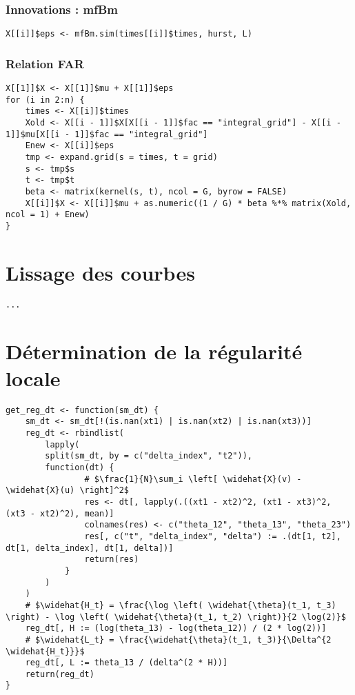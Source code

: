 \subsubsection{Innovations : mfBm}

\begin{verbatim}
X[[i]]$eps <- mfBm.sim(times[[i]]$times, hurst, L)
\end{verbatim}

\subsubsection{Relation FAR}

\begin{verbatim}
X[[1]]$X <- X[[1]]$mu + X[[1]]$eps
for (i in 2:n) {
    times <- X[[i]]$times
    Xold <- X[[i - 1]]$X[X[[i - 1]]$fac == "integral_grid"] - X[[i - 1]]$mu[X[[i - 1]]$fac == "integral_grid"]
    Enew <- X[[i]]$eps
    tmp <- expand.grid(s = times, t = grid)
    s <- tmp$s
    t <- tmp$t
    beta <- matrix(kernel(s, t), ncol = G, byrow = FALSE)
    X[[i]]$X <- X[[i]]$mu + as.numeric((1 / G) * beta %*% matrix(Xold, ncol = 1) + Enew)
}
\end{verbatim}

\section{Lissage des courbes}


\begin{verbatim}
...
\end{verbatim}



\section{Détermination de la régularité locale}

\begin{verbatim}
get_reg_dt <- function(sm_dt) {
    sm_dt <- sm_dt[!(is.nan(xt1) | is.nan(xt2) | is.nan(xt3))]
    reg_dt <- rbindlist(
        lapply(
        split(sm_dt, by = c("delta_index", "t2")),
        function(dt) {
                # $\frac{1}{N}\sum_i \left[ \widehat{X}(v) - \widehat{X}(u) \right]^2$
                res <- dt[, lapply(.((xt1 - xt2)^2, (xt1 - xt3)^2, (xt3 - xt2)^2), mean)] 
                colnames(res) <- c("theta_12", "theta_13", "theta_23")
                res[, c("t", "delta_index", "delta") := .(dt[1, t2], dt[1, delta_index], dt[1, delta])]
                return(res)
            }
        )
    )
    # $\widehat{H_t} = \frac{\log \left( \widehat{\theta}(t_1, t_3) \right) - \log \left( \widehat{\theta}(t_1, t_2) \right)}{2 \log(2)}$
    reg_dt[, H := (log(theta_13) - log(theta_12)) / (2 * log(2))] 
    # $\widehat{L_t} = \frac{\widehat{\theta}(t_1, t_3)}{\Delta^{2 \widehat{H_t}}}$
    reg_dt[, L := theta_13 / (delta^(2 * H))] 
    return(reg_dt)
}
\end{verbatim}

